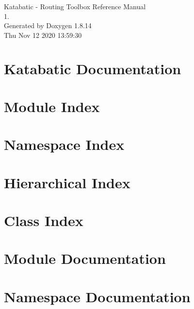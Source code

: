 \documentclass[a4paper]{asimbook}
\begin{document}
   \begin{titlepage}
     \vspace*{7cm}
     \begin{center}
     {\Large Katabatic -\/ Routing Toolbox Reference Manual\\[1ex]\large 1. }\\
     \vspace*{1cm}
     {\large Generated by Doxygen 1.8.14}\\
     \vspace*{0.5cm}
     {\small Thu Nov 12 2020 13:59:30}\\
     \end{center}
   \end{titlepage}

   \clearemptydoublepage

   \tableofcontents
   \clearemptydoublepage

\chapter{Katabatic Documentation}
\label{index}\hypertarget{index}{}
\chapter{Module Index}

\chapter{Namespace Index}

\chapter{Hierarchical Index}

\chapter{Class Index}

\chapter{Module Documentation}


\chapter{Namespace Documentation}







\end{document}

